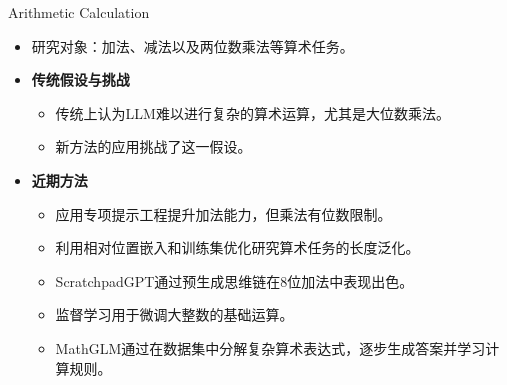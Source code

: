 \begin{frame}{Arithmetic Calculation}
	\begin{itemize}
		\item 研究对象：加法、减法以及两位数乘法等算术任务。

		\item \textbf{传统假设与挑战}
		      \begin{itemize}
			      \item 传统上认为LLM难以进行复杂的算术运算，尤其是大位数乘法。
			      \item 新方法的应用挑战了这一假设。
		      \end{itemize}
		\item \textbf{近期方法}
		      \begin{itemize}
			      \item 应用专项提示工程提升加法能力，但乘法有位数限制。
			      \item 利用相对位置嵌入和训练集优化研究算术任务的长度泛化。
			      \item ScratchpadGPT通过预生成思维链在8位加法中表现出色。
			      \item 监督学习用于微调大整数的基础运算。
			      \item MathGLM通过在数据集中分解复杂算术表达式，逐步生成答案并学习计算规则。
		      \end{itemize}
	\end{itemize}

\end{frame}
